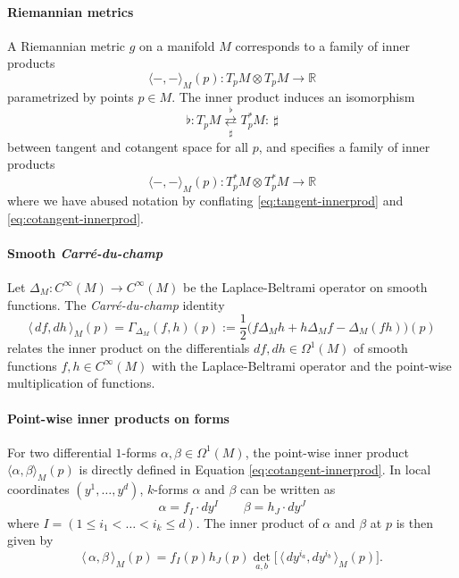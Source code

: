 \documentclass{article}
\newcommand{\R}{\mathbb{R}}
\theoremstyle{remark}
\theoremstyle{plain}
\begin{document}
\paragraph{Riemannian metrics} A Riemannian metric $g$ on a manifold $M$ corresponds to a family of inner products
\begin{equation}\label{eq:tangent-innerprod}
    \langle -, - \rangle_M(p): T_p M \otimes T_pM \to \R
\end{equation} parametrized by points $p \in M$. The inner product induces an isomorphism
\begin{equation} 
    \flat : T_{p}M \underset{\sharp}{\overset{\flat}{\rightleftarrows}} T_{p}^{*}M  : \ \sharp
\end{equation} between tangent and cotangent space for all $p$, and specifies a family of inner products
\begin{equation} \label{eq:cotangent-innerprod}
    \langle -, - \rangle_M(p) :T_p^* M \otimes T_p^*M \to \R
\end{equation} where we have abused notation by conflating \ref{eq:tangent-innerprod} and \ref{eq:cotangent-innerprod}. 

\paragraph{Smooth \textit{Carré-du-champ}} Let $\Delta_M : C^\infty(M) \to C^\infty(M)$ be the Laplace-Beltrami operator on smooth functions. The \textit{Carré-du-champ} identity
\begin{equation}
    \big\langle \,df, dh \,\big\rangle_{M}(p) = \Gamma_{\Delta_M}(f,h)(p) :=\dfrac{1}{2} \Big( f \Delta_M h + h \Delta_M f - \Delta_M(fh) \Big)(p)
\end{equation} relates the inner product on the differentials $df,dh \in \Omega^1(M)$ of smooth functions $f,h \in C^\infty(M)$ with the Laplace-Beltrami operator and the point-wise multiplication of functions.


\paragraph{Point-wise inner products on forms} For two differential $1$-forms $\alpha,\beta \in \Omega^1(M)$, the point-wise inner product $\langle \alpha, \beta \rangle_M(p)$ is directly defined in  Equation \ref{eq:cotangent-innerprod}. In local coordinates $(y^1, \ldots, y^d)$, $k$-forms $\alpha$ and $\beta$ can be written as
\begin{equation}
    \alpha = f_I \cdot dy^I \qquad \beta = h_J \cdot dy^J
\end{equation} where $I = (1\leq i_1 < \ldots < i_k \leq d)$. The inner product of $\alpha$ and $\beta$ at $p$ is then given by
\begin{equation}
    \langle \, \alpha, \beta \, \rangle_M(p) = f_I(p) h_J(p) \det_{a,b} \Big[ \, \langle \,dy^{i_a}, dy^{i_b} \,\rangle_M(p) \Big].
\end{equation}
\end{document}
